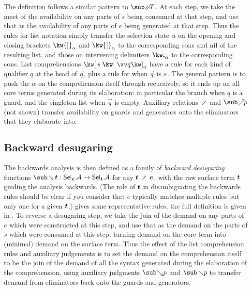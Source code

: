 The definition follows a similar pattern to $\evalFwdF{T}$. At each step, we take the meet of the availability on any parts of $s$ being consumed at that step, and use that as the availability of any parts of $e$ being generated at that step. Thus the rules for list notation simply transfer the selection state $\alpha$ on the opening and closing brackets $\annot{\kw{[}}{\alpha}$ and $\annot{\kw{]}}{\alpha}$ to the corresponding cons and nil of the resulting list, and those on intervening delimiters $\annot{\comma}{\alpha}$ to the corresponding cons. List comprehensions $\annListComp{s}{\vec{q}}{\alpha}$ have a rule for each kind of qualifier $q$ at the head of $\vec{q}$, plus a rule for when $\vec{q}$ is $\varepsilon$. The general pattern is to push the $\alpha$ on the comprehension itself through recursively, so it ends up on all core terms generated during its elaboration: in particular the  branch when $q$ is a guard, and the singleton list when $\vec{q}$ is empty. Auxiliary relations $\clauseFwdR$ and $\totaliseFwdR{p}$ (not shown)  transfer availability on guards and generators onto the eliminators that they elaborate into.

\subsection{Backward desugaring}

The backwards analysis is then defined as a family of \textit{backward desugaring} functions $\desugarBwdR{\raw{t}}: \Sel{\raw{e}}{A} \to \Sel{\raw{t}}{A}$ for any $\raw{t} \desugarFwdR \raw{e}$, with the raw surface term $\bm{t}$ guiding the analysis backwards. (The role of $\bm{t}$ in disambiguating the backwards rules should be clear if you consider that $e$ typically matches multiple rules but only one for a given $\bm{t}$.)  gives some representative rules; the full definition is {\ifappendices given in  \else \IncludedWithSupplementaryMaterial.\fi} To reverse a desugaring step, we take the join of the demand on any parts of $e$ which were constructed at this step, and use that as the demand on the parts of $s$ which were consumed at this step, turning demand on the core term into (minimal) demand on the surface term. Thus the effect of the list comprehension rules and auxiliary judgements is to set the demand on the comprehension itself to be the join of the demand of all the syntax generated during the elaboration of the comprehension, using auxiliary judgments $\totaliseBwdR{p}$ and $\clauseBwdR{p}$ to transfer demand from eliminators back onto the guards and generators.

